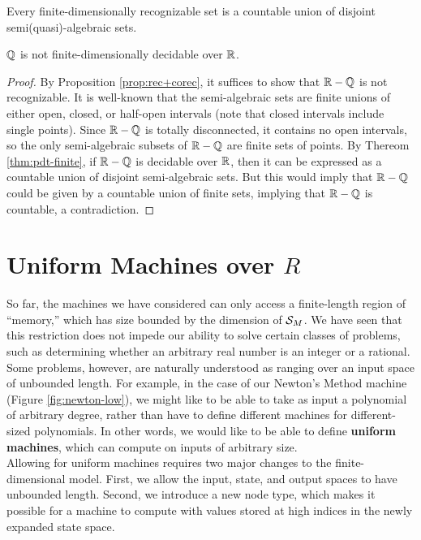   \begin{corollary}
    Every finite-dimensionally recognizable set is a countable union
    of disjoint semi(quasi)-algebraic sets.
  \end{corollary}

  \begin{theorem}
    $\mathbb{Q}$ is not finite-dimensionally decidable over $\mathbb{R}$.
  \end{theorem}
  \begin{proof}
    By Proposition \ref{prop:rec+corec}, it suffices to show that
    $\mathbb{R} - \mathbb{Q}$ is not recognizable.  It is well-known that
    the semi-algebraic sets are finite unions of either open, closed,
    or half-open intervals (note that closed intervals include single
    points).  Since $\mathbb{R} - \mathbb{Q}$ is totally disconnected, it
    contains no open intervals, so the only semi-algebraic subsets of
    $\mathbb{R}-\mathbb{Q}$ are finite sets of points.  By Thereom
    \ref{thm:pdt-finite}, if $\mathbb{R}-\mathbb{Q}$ is decidable over
    $\mathbb{R}$, then it can be expressed as a countable union of
    disjoint semi-algebraic sets.  But this would imply that
    $\mathbb{R}-\mathbb{Q}$ could be given by a countable union of finite
    sets, implying that $\mathbb{R}-\mathbb{Q}$ is countable, a
    contradiction.
  \end{proof}
    
\section{Uniform Machines over $R$}

  So far, the machines we have considered can only access a
  finite-length region of ``memory,'' which has size bounded by the
  dimension of $\mathcal{S}_M$.  We have seen that this restriction
  does not impede our ability to solve certain classes of problems,
  such as determining whether an arbitrary real number is an integer
  or a rational.  Some problems, however, are naturally understood as
  ranging over an input space of unbounded length.  For example, in
  the case of our Newton's Method machine (Figure
  \ref{fig:newton-low}), we might like to be able to take as input a
  polynomial of arbitrary degree, rather than have to define different
  machines for different-sized polynomials.  In other words, we would
  like to be able to define \textbf{uniform machines}, which can
  compute on inputs of arbitrary size.\\

  Allowing for uniform machines requires two major changes to the
  finite-dimensional model.  First, we allow the input, state, and
  output spaces to have unbounded length.  Second, we introduce a new
  node type, which makes it possible for a machine to compute with
  values stored at high indices in the newly expanded state space.\\
  
